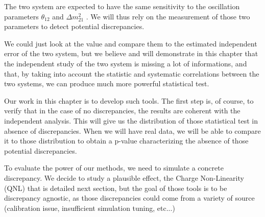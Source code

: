 \documentclass[../main.tex]{subfiles}
\begin{document}
The two system are expected to have the same sensitivity to the oscillation parameters $\theta_{12}$ and $\Delta m^2_{21}$ \cite{juno_collaboration_sub-percent_2022}. We will thus rely on the measurement of those two parameters to detect potential discrepancies.

We could just look at the value and compare them to the estimated independent error of the two system, but we believe and will demonstrate in this chapter that the independent study of the two system is missing a lot of informations, and that, by taking into account the statistic and systematic correlations between the two systems, we can produce much more powerful statistical test.

Our work in this chapter is to develop such tools. The first step is, of course, to verify that in the case of no discrepancies, the results are coherent with the independent analysis. This will give us the distribution of those statistical test in absence of discrepancies. When we will have real data, we will be able to compare it to those distribution to obtain a p-value characterizing the absence of those potential discrepancies.

To evaluate the power of our methods, we need to simulate a concrete discrepancy. We decide to study a plausible effect, the Charge Non-Linearity (QNL) that is detailed next section, but the goal of those tools is to be discrepancy agnostic, as those discrepancies could come from a variety of source (calibration issue, insufficient simulation tuning, etc...)

%
%
%
%
%
%
\end{document}
